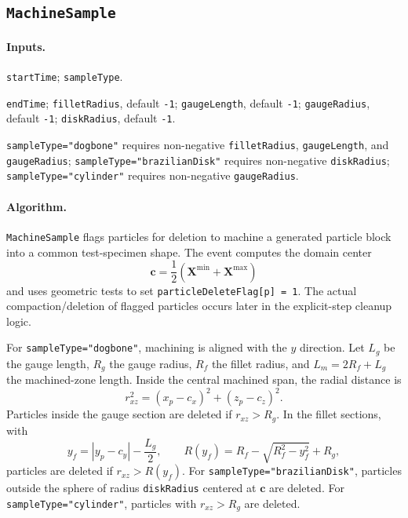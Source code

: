 \subsection{\texttt{MachineSample}}
\label{subsec:event-machine-sample}

\paragraph{Inputs.}
\begin{description}[leftmargin=*,style=nextline]
\item[\textbf{Required.}] \texttt{startTime}; \texttt{sampleType}.
\item[\textbf{Optional.}] \texttt{endTime}; \texttt{filletRadius}, default \texttt{-1}; \texttt{gaugeLength}, default \texttt{-1}; \texttt{gaugeRadius}, default \texttt{-1}; \texttt{diskRadius}, default \texttt{-1}.
\item[\textbf{Conditional requirements.}] \texttt{sampleType="dogbone"} requires non-negative \texttt{filletRadius}, \texttt{gaugeLength}, and \texttt{gaugeRadius}; \texttt{sampleType="brazilianDisk"} requires non-negative \texttt{diskRadius}; \texttt{sampleType="cylinder"} requires non-negative \texttt{gaugeRadius}.
\end{description}

\paragraph{Algorithm.}
\texttt{MachineSample} flags particles for deletion to machine a generated particle block into a common test-specimen shape.  The event computes the domain center
\begin{equation}
  \mathbf{c}=\frac{1}{2}\left(\mathbf{X}^{\min}+\mathbf{X}^{\max}\right)
\end{equation}
and uses geometric tests to set \texttt{particleDeleteFlag[p] = 1}.  The actual compaction/deletion of flagged particles occurs later in the explicit-step cleanup logic.

For \texttt{sampleType="dogbone"}, machining is aligned with the $y$ direction.  Let $L_g$ be the gauge length, $R_g$ the gauge radius, $R_f$ the fillet radius, and $L_m=2R_f+L_g$ the machined-zone length.  Inside the central machined span, the radial distance is
\begin{equation}
  r_{xz}^2=(x_p-c_x)^2+(z_p-c_z)^2.
\end{equation}
Particles inside the gauge section are deleted if $r_{xz}>R_g$.  In the fillet sections, with
\begin{equation}
  y_f = |y_p-c_y|-\frac{L_g}{2},
  \qquad
  R(y_f)=R_f-\sqrt{R_f^2-y_f^2}+R_g,
\end{equation}
particles are deleted if $r_{xz}>R(y_f)$.  For \texttt{sampleType="brazilianDisk"}, particles outside the sphere of radius \texttt{diskRadius} centered at $\mathbf{c}$ are deleted.  For \texttt{sampleType="cylinder"}, particles with $r_{xz}>R_g$ are deleted.

